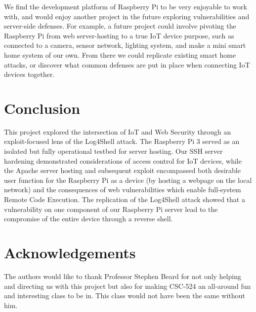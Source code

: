 \documentclass[sigconf]{acmart}
\begin{document}
We find the development platform of Raspberry Pi to be very enjoyable to work with, and would enjoy another project in the
future exploring vulnerabilities and server-side defenses. For example, a future project could involve pivoting the Raspberry Pi
from web server-hosting to a true IoT device purpose, such as connected to a camera, sensor network, lighting system, and 
make a mini smart home system of our own. From there we could replicate existing smart home attacks, or discover what 
common defenses are put in place when connecting IoT devices together.  

\section{Conclusion}

This project explored the intersection of IoT and Web Security through an exploit-focused lens of the Log4Shell attack.
The Raspberry Pi 3 served as an isolated but fully operational testbed for server hosting. Our SSH server hardening
demonstrated considerations of access control for IoT devices, while the Apache server hosting and subsequent exploit
encompassed both desirable user function for the Raspberry Pi as a device (by hosting a webpage on the local network) 
and the consequences of web vulnerabilities which enable full-system Remote Code Execution. The replication of the Log4Shell
attack showed that a vulnerability on one component of our Raspberry Pi server lead to the compromise of the entire device 
through a reverse shell. 

\section{Acknowledgements}
The authors would like to thank Professor Stephen Beard for not only helping and directing us with this project
but also for making CSC-524 an all-around fun and interesting class to be in. This class would not have been
the same without him.





\end{document}
